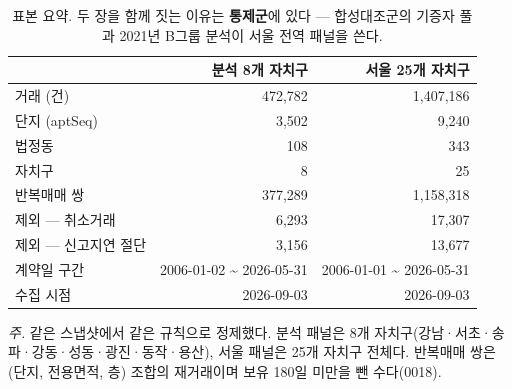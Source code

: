 \begin{table}[htbp]
  \centering
  \caption{표본 요약. 두 장을 함께 짓는 이유는 \textbf{통제군}에 있다 --- 합성대조군의 기증자 풀과 2021년 B그룹 분석이 서울 전역 패널을 쓴다.}
  \label{tab:sample}
  \begin{tabular}{lrr}
    \toprule
    \textbf{} & \textbf{분석 8개 자치구} & \textbf{서울 25개 자치구} \\
    \midrule
    거래 (건) & 472,782 & 1,407,186 \\
    단지 (aptSeq) & 3,502 & 9,240 \\
    법정동 & 108 & 343 \\
    자치구 & 8 & 25 \\
    반복매매 쌍 & 377,289 & 1,158,318 \\
    제외 --- 취소거래 & 6,293 & 17,307 \\
    제외 --- 신고지연 절단 & 3,156 & 13,677 \\
    계약일 구간 & 2006-01-02 \textasciitilde{} 2026-05-31 & 2006-01-01 \textasciitilde{} 2026-05-31 \\
    수집 시점 & 2026-09-03 & 2026-09-03 \\
    \bottomrule
  \end{tabular}

  \begin{minipage}{\linewidth}\footnotesize
  \textit{주.} 같은 스냅샷에서 같은 규칙으로 정제했다. 분석 패널은 8개 자치구(강남·서초·송파·강동·성동·광진·동작·용산), 서울 패널은 25개 자치구 전체다. 반복매매 쌍은 (단지, 전용면적, 층) 조합의 재거래이며 보유 180일 미만을 뺀 수다(0018).
  \end{minipage}
\end{table}
